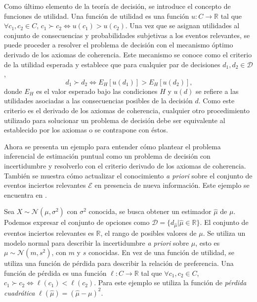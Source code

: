 \documentclass[11pt,a4paper]{article}
\begin{document}
Como último elemento de la teoría de decisión, se introduce el concepto de funciones de utilidad. Una función de utilidad es una función $u: C \to \mathbb{R}$ tal que $\forall c_1, c_2 \in C$, $c_1 \succ c_2 \iff u(c_1) > u(c_2)$. Una vez que se asignan utilidades al conjunto de consecuencias y probabilidades subjetivas a los eventos relevantes, se puede proceder a resolver el problema de decisión con el mecanismo óptimo derivado de los axiomas de coherencia. Este mecanismo se conoce como el criterio de la utilidad esperada y establece que para cualquier par de decisiones $d_1, d_2 \in \mathcal{D}$, $$ \ d_1 \succ d_2 \iff E_H[u(d_1)] > E_H[u(d_2)],$$ donde $E_H$ es el valor esperado bajo las condiciones $H$ y $u(d)$ se refiere a las utilidades asociadas a las consecuencias posibles de la decisión $d$. Como este criterio es el derivado de los axiomas de coherencia, cualquier otro procedimiento utilizado para solucionar un problema de decisión debe ser equivalente al establecido por los axiomas o se contrapone con éstos.

Ahora se presenta un ejemplo para entender cómo plantear el problema inferencial de estimación puntual como un problema de decisión con incertidumbre y resolverlo con el criterio derivado de los axiomas de coherencia. También se muestra cómo actualizar el conocimiento \textit{a priori} sobre el conjunto de eventos inciertos relevantes $\mathcal{E}$ en presencia de nueva información. Este ejemplo se encuentra en \citet{mendoza}.

Sea $X \sim \mathcal{N}(\mu, \sigma^2)$ con $\sigma^2$ conocida, se busca obtener un estimador $\hat{\mu}$ de $\mu$. Podemos expresar el conjunto de opciones como $\mathcal{D} = \lbrace d_{\hat{\mu}} | \hat{\mu} \in \mathbb{R}\rbrace$. El conjunto de eventos inciertos relevantes es $\mathbb{R}$, el rango de posibles valores de $\mu$. Se utiliza un modelo normal para describir la incertidumbre \textit{a priori} sobre $\mu$, esto es $\mu \sim \mathcal{N}(m, s^2)$, con $m$ y $s$ conocidas. En vez de una función de utilidad, se utiliza una función de pérdida para describir la relación de preferencia. Una función de pérdida es una función $\ell : C \to \mathbb{R}$ tal que $\forall c_1, c_2 \in C$, $c_1 \succ c_2 \iff \ell (c_1) < \ell (c_2)$. Para este ejemplo se utiliza la función de \textit{pérdida cuadrática} $\ell (\hat{\mu}) = (\hat{\mu} - \mu)^2$. 
\end{document}
